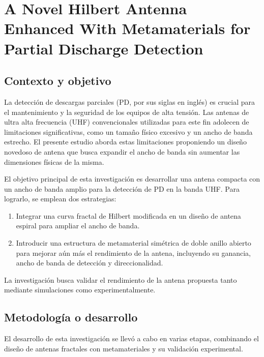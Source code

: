 \section{A Novel Hilbert Antenna Enhanced With Metamaterials for Partial Discharge Detection}

\subsection*{Contexto y objetivo}
La detección de descargas parciales (PD, por sus siglas en inglés) es crucial para el mantenimiento y la seguridad de los equipos de alta tensión. Las antenas de ultra alta frecuencia (UHF) convencionales utilizadas para este fin adolecen de limitaciones significativas, como un tamaño físico excesivo y un ancho de banda estrecho. El presente estudio aborda estas limitaciones proponiendo un diseño novedoso de antena que busca expandir el ancho de banda sin aumentar las dimensiones físicas de la misma.

El objetivo principal de esta investigación es desarrollar una antena compacta con un ancho de banda amplio para la detección de PD en la banda UHF. Para lograrlo, se emplean dos estrategias:
\begin{enumerate}
    \item Integrar una curva fractal de Hilbert modificada en un diseño de antena espiral para ampliar el ancho de banda.
    \item Introducir una estructura de metamaterial simétrica de doble anillo abierto para mejorar aún más el rendimiento de la antena, incluyendo su ganancia, ancho de banda de detección y direccionalidad.
\end{enumerate}
La investigación busca validar el rendimiento de la antena propuesta tanto mediante simulaciones como experimentalmente.

\subsection*{Metodología o desarrollo}
El desarrollo de esta investigación se llevó a cabo en varias etapas, combinando el diseño de antenas fractales con metamateriales y su validación experimental.

